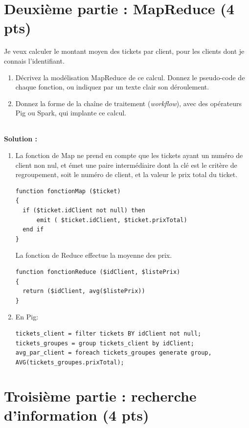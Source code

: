 \documentclass[11pt,a4paper]{article}
\newenvironment{solution}[0]{
~\\ \color{red} \textbf{Solution : }\color{black}}{%
}
\begin{document}
\section*{Deuxième partie : MapReduce (4 pts)}

Je veux calculer le montant moyen des tickets par client, pour les clients dont
je connais l'identifiant. 

\begin{enumerate}
 \item Décrivez la modélisation MapReduce de ce calcul. 
 Donnez le pseudo-code de chaque
fonction, ou indiquez par un texte clair son déroulement.
\item Donnez la forme de la chaîne de traitement (\textit{workflow}), avec des opérateurs Pig ou Spark,
      qui implante ce calcul.
\end{enumerate}


\begin{solution}

\begin{enumerate}
 
\item La fonction de Map  ne prend en compte que les tickets ayant un numéro de client non nul,
   et émet  une paire intermédiaire dont la clé est le critère de regroupement,
soit le numéro de client, et la valeur le prix total du ticket.

\begin{verbatim}
function fonctionMap ($ticket)
{
  if ($ticket.idClient not null) then
      emit ( $ticket.idClient, $ticket.prixTotal)
  end if
}
\end{verbatim}

La fonction de Reduce effectue la moyenne des prix.
\begin{verbatim}
function fonctionReduce ($idClient, $listePrix)
{
  return ($idClient, avg($listePrix))
}
\end{verbatim}

\item En Pig:

\begin{verbatim}
tickets_client = filter tickets BY idClient not null;
tickets_groupes = group tickets_client by idClient;
avg_par_client = foreach tickets_groupes generate group, AVG(tickets_groupes.prixTotal);
\end{verbatim}
\end{enumerate}
\end{solution}

\section*{Troisième partie : recherche d'information (4 pts)}
\end{document}
